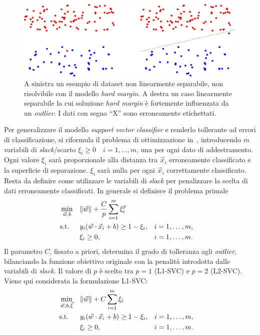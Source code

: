 \begin{figure}
    \centering
    \includegraphics[width=\linewidth]{img/casi_dove_hardmargin_va_male_o_non_va.pdf}
    \caption{A sinistra un esempio di dataset non linearmente separabile, non risolvibile con il modello \emph{hard margin}. A destra un caso linearmente separabile la cui soluzione \emph{hard margin} è fortemente influenzata da un \emph{outlier}. I dati con segno ``X'' sono erroneamente etichettati.}
    \label{fig:svc:softmargin:casi_che_hardmargin_non_risolve}
\end{figure}
Per generalizzare il modello \emph{support vector classifier} e renderlo tollerante ad errori di classificazione, si riformula il problema di ottimizzazione in~, introducendo $m$ variabili di \emph{slack}/scarto $\xi_i \geq 0 \quad i=1,...,m$, una per ogni dato di addestramento. Ogni valore $\xi_i$ sarà proporzionale alla distanza tra $\Vec{x}_i$ erroneamente classificato e la superficie di separazione. $\xi_i$ sarà nulla per ogni $\Vec{x}_i$ correttamente classificato. Resta da definire come utilizzare le variabili di \emph{slack} per penalizzare la scelta di dati erroneamente classificati. 
In generale si definisce il problema primale
\begin{equation}
\begin{aligned}
& \min_{\Vec{w},b}    && \|\Vec{w}\| + \frac{C}{p}\sum_{i=1}^{m}\xi_i^p\\
& \textrm{s.t.} && y_i(\Vec{w}\cdot\Vec{x}_i + b) \geq 1 - \xi_i, &&  i=1,\dots,m, \\
&               && \xi_i \geq 0,                 &&  i=1,\dots,m.\\
\end{aligned}
\end{equation}
Il parametro $C$, fissato a priori, determina il grado di tolleranza agli \emph{outlier}, bilanciando la funzione obiettivo originale con la penalità introdotta dalle variabili di \emph{slack}.
%
Il valore di $p$ è scelto tra $p=1$ (L1-SVC) e $p=2$ (L2-SVC). Viene qui considerata la formulazione L1-SVC:
\begin{equation}
\label{eq:svc:softmargin:primal}
\begin{aligned}
& \min_{\Vec{w},b,\Vec{\xi}}    && \|\Vec{w}\| + C\sum_{i=1}^{m}\xi_i\\
& \textrm{s.t.} && y_i(\Vec{w}\cdot\Vec{x}_i + b) \geq 1 - \xi_i, &&  i=1,\dots,m, \\
&               && \xi_i \geq 0,                 &&  i=1,\dots,m.\\
\end{aligned}
\end{equation}
